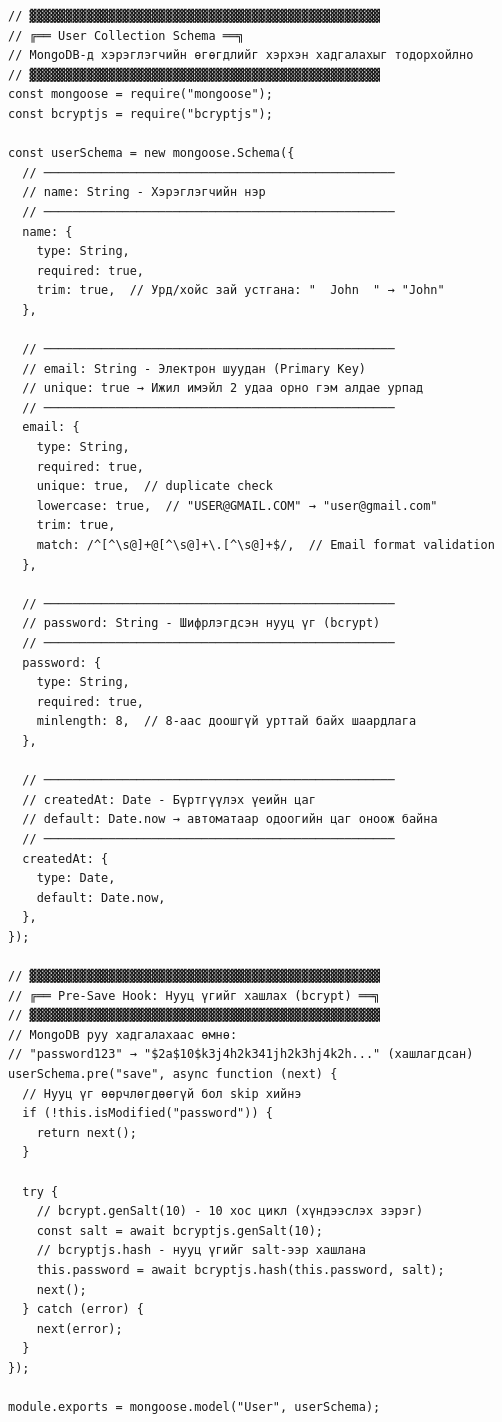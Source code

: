 \begin{lstlisting}[caption={models/User.js -- Хэрэглэгчийн схем}]
// ▓▓▓▓▓▓▓▓▓▓▓▓▓▓▓▓▓▓▓▓▓▓▓▓▓▓▓▓▓▓▓▓▓▓▓▓▓▓▓▓▓▓▓▓▓▓▓▓▓
// ╔══ User Collection Schema ══╗
// MongoDB-д хэрэглэгчийн өгөгдлийг хэрхэн хадгалахыг тодорхойлно
// ▓▓▓▓▓▓▓▓▓▓▓▓▓▓▓▓▓▓▓▓▓▓▓▓▓▓▓▓▓▓▓▓▓▓▓▓▓▓▓▓▓▓▓▓▓▓▓▓▓
const mongoose = require("mongoose");
const bcryptjs = require("bcryptjs");

const userSchema = new mongoose.Schema({
  // ─────────────────────────────────────────────────
  // name: String - Хэрэглэгчийн нэр
  // ─────────────────────────────────────────────────
  name: {
    type: String,
    required: true,
    trim: true,  // Урд/хойс зай устгана: "  John  " → "John"
  },

  // ─────────────────────────────────────────────────
  // email: String - Электрон шуудан (Primary Key)
  // unique: true → Ижил имэйл 2 удаа орно гэм алдае урпад
  // ─────────────────────────────────────────────────
  email: {
    type: String,
    required: true,
    unique: true,  // duplicate check
    lowercase: true,  // "USER@GMAIL.COM" → "user@gmail.com"
    trim: true,
    match: /^[^\s@]+@[^\s@]+\.[^\s@]+$/,  // Email format validation
  },

  // ─────────────────────────────────────────────────
  // password: String - Шифрлэгдсэн нууц үг (bcrypt)
  // ─────────────────────────────────────────────────
  password: {
    type: String,
    required: true,
    minlength: 8,  // 8-аас доошгүй урттай байх шаардлага
  },

  // ─────────────────────────────────────────────────
  // createdAt: Date - Бүртгүүлэх үеийн цаг
  // default: Date.now → автоматаар одоогийн цаг оноож байна
  // ─────────────────────────────────────────────────
  createdAt: {
    type: Date,
    default: Date.now,
  },
});

// ▓▓▓▓▓▓▓▓▓▓▓▓▓▓▓▓▓▓▓▓▓▓▓▓▓▓▓▓▓▓▓▓▓▓▓▓▓▓▓▓▓▓▓▓▓▓▓▓▓
// ╔══ Pre-Save Hook: Нууц үгийг хашлах (bcrypt) ══╗
// ▓▓▓▓▓▓▓▓▓▓▓▓▓▓▓▓▓▓▓▓▓▓▓▓▓▓▓▓▓▓▓▓▓▓▓▓▓▓▓▓▓▓▓▓▓▓▓▓▓
// MongoDB руу хадгалахаас өмнө:
// "password123" → "$2a$10$k3j4h2k341jh2k3hj4k2h..." (хашлагдсан)
userSchema.pre("save", async function (next) {
  // Нууц үг өөрчлөгдөөгүй бол skip хийнэ
  if (!this.isModified("password")) {
    return next();
  }

  try {
    // bcrypt.genSalt(10) - 10 хос цикл (хүндээслэх зэрэг)
    const salt = await bcryptjs.genSalt(10);
    // bcryptjs.hash - нууц үгийг salt-ээр хашлана
    this.password = await bcryptjs.hash(this.password, salt);
    next();
  } catch (error) {
    next(error);
  }
});

module.exports = mongoose.model("User", userSchema);
\end{lstlisting}

